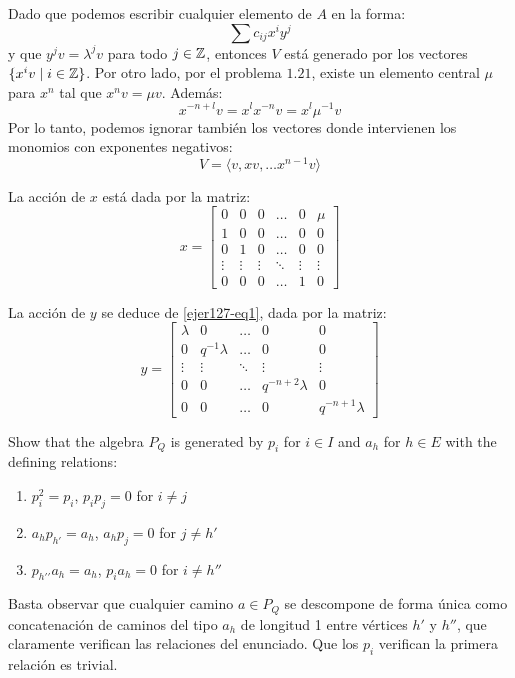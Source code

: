 \documentclass[twoside]{article}
\begin{document}
\begin{solucion}
\begin{enumerate}[(a)]
Dado que podemos escribir cualquier elemento de $A$ en la forma:
\[ \sum c_{ij} x^i y^j \]
y que $y^jv = \lambda^j v$ para todo $j \in \mathbb{Z}$, entonces $V$ está generado por los vectores $\{x^iv \mid i \in \mathbb{Z}\}$.
Por otro lado, por el problema $1.21$, existe un elemento central $\mu$ para $x^n$ tal que $x^nv=\mu v$.
Además:
\[ x^{-n+l}v = x^{l}x^{-n}v = x^l\mu^{-1} v \]
Por lo tanto, podemos ignorar también los vectores donde intervienen los monomios con exponentes negativos:
\[ V = \langle v, xv, \dots x^{n-1}v \rangle \]

La acción de $x$ está dada por la matriz:
\[ x = \begin{bmatrix}
0 & 0 & 0 & \dots & 0 & \mu\\
1 & 0 & 0 & \dots & 0 & 0\\
0 & 1 & 0 & \dots & 0 & 0\\
\vdots & \vdots & \vdots & \ddots & \vdots & \vdots\\
0 & 0 & 0 & \dots & 1 & 0
\end{bmatrix}\]

La acción de $y$ se deduce de \eqref{ejer127-eq1}, dada por la matriz:
\[ y = \begin{bmatrix}
\lambda & 0 & \dots & 0 & 0\\
0 & q^{-1}\lambda & \dots & 0 & 0\\
\vdots & \vdots & \ddots & \vdots & \vdots\\
0 & 0 & \dots & q^{-n+2} \lambda & 0\\
0 & 0 & \dots & 0 & q^{-n+1} \lambda
\end{bmatrix}\]
\end{enumerate}
\end{solucion}

\newpage
\begin{ejercicio}{1.33}
Show that the algebra $P_Q$ is generated by $p_i$ for $i ∈ I$ and $a_h$ for $h ∈ E$ with the
defining relations:
\begin{enumerate}
\item $p^2_i = p_i$, $p_ip_j = 0$ for $i\neq j$
\item $a_hp_{h′} = a_h$, $a_hp_j = 0$ for $j\neq h′$
\item $p_{{h'}'}a_h = a_h$, $p_ia_h = 0$ for $i\neq h''$
\end{enumerate}
\end{ejercicio}
\begin{solucion}
Basta observar que cualquier camino $a\in P_Q$ se descompone de forma única como concatenación de caminos del tipo $a_h$ de longitud 1 entre vértices $h'$ y $h''$, que claramente verifican las relaciones del enunciado. Que los $p_i$ verifican la primera relación es trivial. 
\end{solucion}
\end{document}
